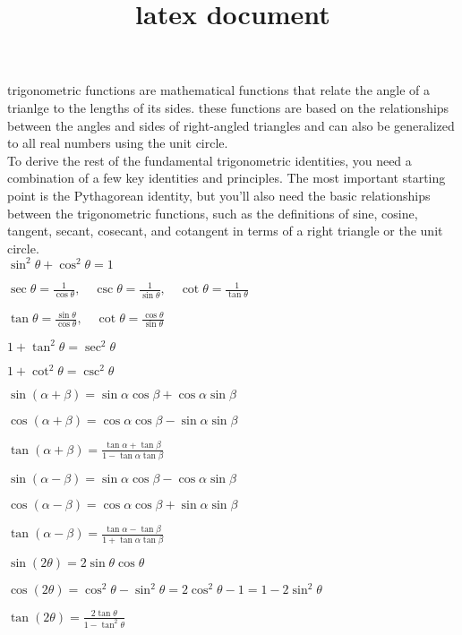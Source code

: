 \documentclass{article}
\begin{document}
\title{latex document} \maketitle

trigonometric functions are mathematical functions that relate the angle of a trianlge to the lengths of its sides. these functions are based on the relationships between the angles and sides of right-angled triangles and can also be generalized to all real numbers using the unit circle.\\

To derive the rest of the fundamental trigonometric identities, you need a combination of a few key identities and principles. The most important starting point is the Pythagorean identity, but you’ll also need the basic relationships between the trigonometric functions, such as the definitions of sine, cosine, tangent, secant, cosecant, and cotangent in terms of a right triangle or the unit circle. \\

$ \sin^2 \theta + \cos^2 \theta = 1 $

$ \sec \theta = \frac{1}{\cos \theta}, \quad \csc \theta = \frac{1}{\sin \theta}, \quad \cot \theta = \frac{1}{\tan \theta} $

$ \tan \theta = \frac{\sin \theta}{\cos \theta}, \quad \cot \theta = \frac{\cos \theta}{\sin \theta} $

$ 1 + \tan^2 \theta = \sec^2 \theta $

$ 1 + \cot^2 \theta = \csc^2 \theta $

$ \sin(\alpha + \beta) = \sin \alpha \cos \beta + \cos \alpha \sin \beta $

$ \cos(\alpha + \beta) = \cos \alpha \cos \beta - \sin \alpha \sin \beta $

$ \tan(\alpha + \beta) = \frac{\tan \alpha + \tan \beta}{1 - \tan \alpha \tan \beta} $

$ \sin(\alpha - \beta) = \sin \alpha \cos \beta - \cos \alpha \sin \beta $

$ \cos(\alpha - \beta) = \cos \alpha \cos \beta + \sin \alpha \sin \beta $

$ \tan(\alpha - \beta) = \frac{\tan \alpha - \tan \beta}{1 + \tan \alpha \tan \beta} $

$ \sin(2\theta) = 2\sin \theta \cos \theta $

$ \cos(2\theta) = \cos^2 \theta - \sin^2 \theta = 2\cos^2 \theta - 1 = 1 - 2\sin^2 \theta $

$ \tan(2\theta) = \frac{2\tan \theta}{1 - \tan^2 \theta} $
\end{document}

